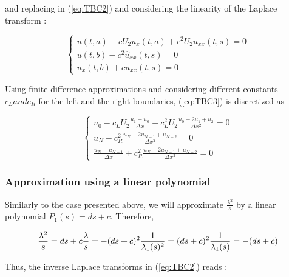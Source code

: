\noindent and replacing in (\ref{eq:TBC2}) and considering the linearity of the Laplace transform : 

\begin{equation}
\label{eq:TBC3}
    \begin{cases}
        u(t,a) - cU_2 u_x(t,a)  + c^2 U_2    u_{xx}(t,s) = 0 \\
        u(t,b) - c^2    \hat{u}_{xx}(t,s) = 0 \\
        u_x(t,b) + c u_{xx}(t,s)= 0 
    \end{cases}
\end{equation}

\indent Using finite difference approximations and considering different constants $c_L and c_R$ for the left and the right boundaries, (\ref{eq:TBC3}) is discretized as

\begin{equation}
\label{eq:TBC4}
    \begin{cases}
        u_0 - c_LU_2 \frac{u_1 - u_0}{\Delta x}  + c_L^2 U_2 \frac{u_0 -2u_1 + u_2}{\Delta x^2} = 0 \\
        u_N - c_R^2    \frac{u_N -2u_{N-1} + u_{N-2}}{\Delta x^2} = 0 \\
        \frac{u_N - u_{N-1}}{\Delta x}  + c_R^2    \frac{u_N -2u_{N-1} + u_{N-2}}{\Delta x^2} = 0 
    \end{cases}
\end{equation}



\subsubsection{Approximation using a linear polynomial}


\indent Similarly to the case presented above, we will approximate $\frac{\lambda^2}{s}$ by a linear polynomial $P_1(s) = ds + c$. Therefore,

\begin{equation}
    \frac{\lambda^2}{s} = ds + c \\
    \frac{\lambda}{s} = -(ds + c )^2 \\
    \frac{1}{\lambda_1(s)^2} = (ds + c )^2 \\
    \frac{1}{\lambda_1(s)} = -(ds + c )  
\end{equation}

\indent Thus, the inverse Laplace transforms in (\ref{eq:TBC2}) reads :


